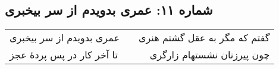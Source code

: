 \begin{center}
\section*{شماره ۱۱: عمری بدویدم از سر بیخبری}
\label{sec:011}
\begin{longtable}{l p{0.5cm} r}
عمری بدویدم از سر بیخبری
&&
گفتم که مگر به عقل گشتم هنری
\\
تا آخر کار در پس پردهٔ عجز
&&
چون پیرزنان نشستهام زارگری
\\
\end{longtable}
\end{center}
